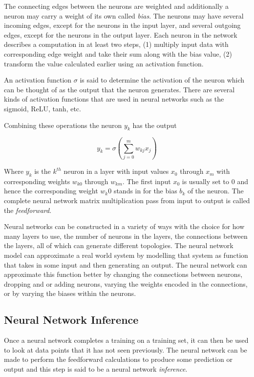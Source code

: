 The connecting edges between the neurons are weighted and additionally a neuron may carry a weight of its own called \textit{bias}. The neurons may have several incoming edges, except for the neurons in the input layer, and several outgoing edges, except for the neurons in the output layer. Each neuron in the network describes a computation in at least two steps, (1) multiply input data with corresponding edge weight and take their sum along with the bias value, (2) transform the value calculated earlier using an activation function.

An activation function $\sigma$ is said to determine the activation of the neuron which can be thought of as the output that the neuron generates. There are several kinds of activation functions that are used in neural networks such as the sigmoid, ReLU, tanh, etc.

Combining these operations the neuron $y_k$ has the output

\begin{equation}
	y_k = \sigma \left( \sum_{j=0}^m w_{kj} x_j \right)
\end{equation}

Where $y_k$ is the $k^{th}$ neuron in a layer with input values $x_0$ through $x_m$ with corresponding weights $w_{k0}$ through $w_{km}$. The first input $x_0$ is usually set to $0$ and hence the corresponding weight $w_k0$ stands in for the bias $b_k$ of the neuron. The complete neural network matrix multiplication pass from input to output is called the \textit{feedforward}.

Neural networks can be constructed in a variety of ways with the choice for how many layers to use, the number of neurons in the layers, the connections between the layers, all of which can generate different topologies. The neural network model can approximate a real world system by modelling that system as function that takes in some input and then generating an output. The neural network can approximate this function better by changing the connections between neurons, dropping and or adding neurons, varying the weights encoded in the connections, or by varying the biases within the neurons.

\subsection{Neural Network Inference}

Once a neural network completes a training on a training set, it can then be used to look at data points that it has not seen previously. The neural network can be made to perform the feedforward calculations to produce some prediction or output and this step is said to be a neural network \textit{inference}.

